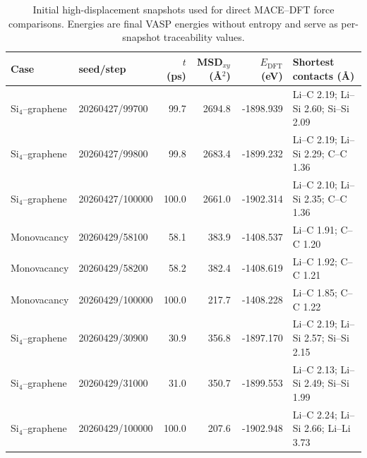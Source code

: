 \documentclass[11pt]{article}
\begin{document}
\begin{table}[H]
  \centering
  \scriptsize
  \caption{Initial high-displacement snapshots used for direct MACE--DFT force
  comparisons. Energies are final VASP energies without entropy and serve as
  per-snapshot traceability values.}
  \label{tab:si_initial_snapshots}
  \begin{tabular}{llrrrp{3.4cm}}
    \toprule
    Case & seed/step & $t$ (ps) & MSD$_{xy}$ (\AA$^2$) & $E_{\mathrm{DFT}}$ (eV) & Shortest contacts (\AA) \\
    \midrule
    Si$_4$--graphene & 20260427/99700 & 99.7 & 2694.8 & -1898.939 & Li--C 2.19; Li--Si 2.60; Si--Si 2.09 \\
    Si$_4$--graphene & 20260427/99800 & 99.8 & 2683.4 & -1899.232 & Li--C 2.19; Li--Si 2.29; C--C 1.36 \\
    Si$_4$--graphene & 20260427/100000 & 100.0 & 2661.0 & -1902.314 & Li--C 2.10; Li--Si 2.35; C--C 1.36 \\
    Monovacancy & 20260429/58100 & 58.1 & 383.9 & -1408.537 & Li--C 1.91; C--C 1.20 \\
    Monovacancy & 20260429/58200 & 58.2 & 382.4 & -1408.619 & Li--C 1.92; C--C 1.21 \\
    Monovacancy & 20260429/100000 & 100.0 & 217.7 & -1408.228 & Li--C 1.85; C--C 1.22 \\
    Si$_4$--graphene & 20260429/30900 & 30.9 & 356.8 & -1897.170 & Li--C 2.19; Li--Si 2.57; Si--Si 2.15 \\
    Si$_4$--graphene & 20260429/31000 & 31.0 & 350.7 & -1899.553 & Li--C 2.13; Li--Si 2.49; Si--Si 1.99 \\
    Si$_4$--graphene & 20260429/100000 & 100.0 & 207.6 & -1902.948 & Li--C 2.24; Li--Si 2.66; Li--Li 3.73 \\
    \bottomrule
  \end{tabular}
\end{table}
\end{document}
